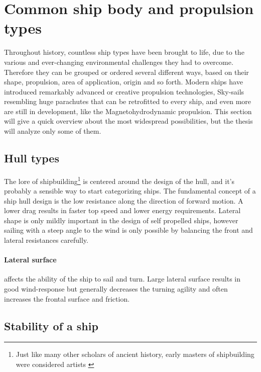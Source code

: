 \section{Common ship body and propulsion types}

Throughout history, countless ship types have been brought to life, due to the various and ever-changing environmental challenges they had to overcome. Therefore they can be grouped or ordered several different ways, based on their shape, propulsion, area of application, origin and so forth. Modern ships have introduced remarkably advanced or creative propulsion technologies, Sky-sails resembling huge parachutes\cite[p 48.]{future_propulsions} that can be retrofitted to every ship, and even more are still in development, like the Magnetohydrodynamic propulsion\cite[p. 61.]{future_propulsions}. This section will give a quick overview about the most widespread possibilities, but the thesis will analyze only some of them.

\subsection{Hull types}

The lore of shipbuilding\footnote{Just like many other scholars of ancient history, early masters of shipbuilding were considered artists \cite{Art_of_shipbuilding}} is centered around the design of the hull, and it's probably a sensible way to start categorizing ships.
The fundamental concept of a ship hull design is the low resistance along the direction of forward motion. A lower drag results in faster top speed and lower energy requirements. Lateral shape is only mildly important in the design of self propelled ships, however sailing with a steep angle to the wind is only possible by balancing the front and lateral resistances carefully\cite{vitorlazas}.

\paragraph{Lateral surface} affects the ability of the ship to sail and turn. Large lateral surface results in good wind-response but generally decreases the turning agility and often increases the frontal surface and friction.

\subsection{Stability of a ship}

